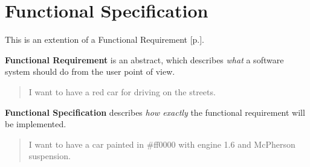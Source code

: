 \section{Functional Specification}
\label{sec:Functional Specification}

This is an extention of a Functional Requirement [p.\pageref{sec:Functional Requirement}].

\textbf{Functional Requirement} is an abstract, which describes \emph{what} a software system should do from the user point of view.

\begin{quote}
 I want to have a red car for driving on the streets.
\end{quote} 

\textbf{Functional Specification} describes \emph{how exactly} the functional requirement will be implemented.

\begin{quote}
 I want to have a car painted in \#ff0000 with engine 1.6 and McPherson suspension.
\end{quote} 

